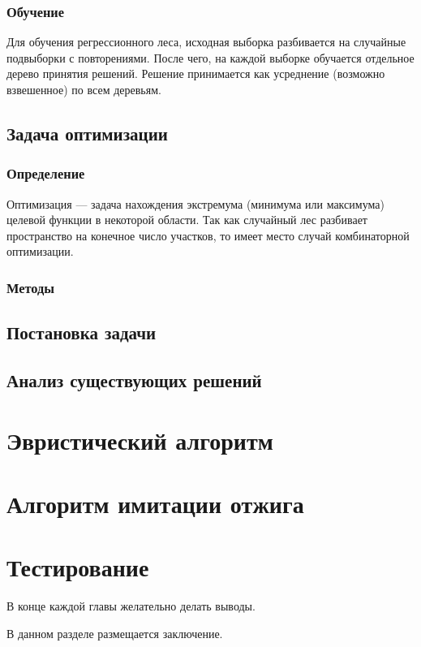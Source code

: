 \documentclass[pscyr,specification,annotation]{itmo-student-thesis}
\begin{document}
\subsection{Обучение}
Для обучения регрессионного леса, исходная выборка разбивается на случайные подвыборки с повторениями. 
После чего, на каждой выборке обучается отдельное дерево принятия решений.
Решение принимается как усреднение (возможно взвешенное) по всем деревьям.


\section{Задача оптимизации}
\subsection{Определение}
Оптимизация --- задача нахождения экстремума (минимума или максимума) целевой функции в некоторой области. 
Так как случайный лес разбивает пространство на конечное число участков, то имеет место случай
комбинаторной оптимизации.

\subsection{Методы}

\section{Постановка задачи}

\section{Анализ существующих решений}

\chapter{Эвристический алгоритм}

\chapter{Алгоритм имитации отжига}

\chapter{Тестирование}

\chapterconclusion{}

В конце каждой главы желательно делать выводы.

\conclusionpage{}

В данном разделе размещается заключение.

\printmainbibliography{}
\end{document}
